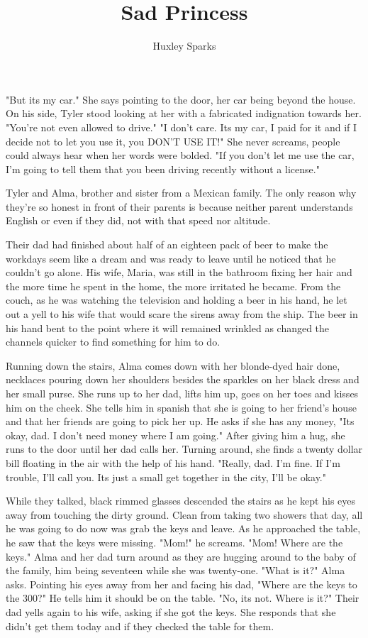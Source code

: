 \title{Sad Princess}
\author{Huxley Sparks}
\begin{Document}
        "But its my car." She says pointing to the door, her car being beyond the house. On his side, Tyler stood looking at her with a
    fabricated indignation towards her. "You're not even allowed to drive." "I don't care. Its my car, I paid for it and if I decide not
    to let you use it, you DON'T USE IT!" She never screams, people could always hear when her words were bolded. "If you don't let me
    use the car, I'm going to tell them that you been driving recently without a license."

        Tyler and Alma, brother and sister from a Mexican family. The only reason why they're so honest in front of their parents is because
    neither parent understands English or even if they did, not with that speed nor altitude. 

        Their dad had finished about half of an eighteen pack of beer to make the workdays seem like a dream and was ready to leave until he
    noticed that he couldn't go alone. His wife, Maria, was still in the bathroom fixing her hair and the more time he spent in the home, the
    more irritated he became. From the couch, as he was watching the television and holding a beer in his hand, he let out a yell to his wife that would 
    scare the sirens away from the ship. The beer in his hand bent to the point where it will remained wrinkled as changed the
    channels quicker to find something for him to do.

        Running down the stairs, Alma comes down with her blonde-dyed hair done, necklaces pouring down her shoulders besides the sparkles on her black
    dress and her small purse. She runs up to her dad, lifts him up, goes on her toes and kisses him on the cheek. She tells him in spanish that
    she is going to her friend's house and that her friends are going to pick her up. He asks if she has any money, "Its okay, dad. I don't need
    money where I am going." After giving him a hug, she runs to the door until her dad calls her. Turning around, she finds a twenty dollar bill
    floating in the air with the help of his hand. "Really, dad. I'm fine. If I'm trouble, I'll call you. Its just a small get together in the city,
    I'll be okay."

        While they talked, black rimmed glasses descended the stairs as he kept his eyes away from touching the dirty ground. Clean from taking
    two showers that day, all he was going to do now was grab the keys and leave. As he approached the table, he saw that the keys were missing.
    "Mom!" he screams. "Mom! Where are the keys." Alma and her dad turn around as they are hugging around to the baby of the family, him being
    seventeen while she was twenty-one. "What is it?" Alma asks. Pointing his eyes away from her and facing his dad, "Where are the keys to the
    300?" He tells him it should be on the table. "No, its not. Where is it?" Their dad yells again to his wife, asking if she got the keys. She
    responds that she didn't get them today and if they checked the table for them.


\end{Document}
